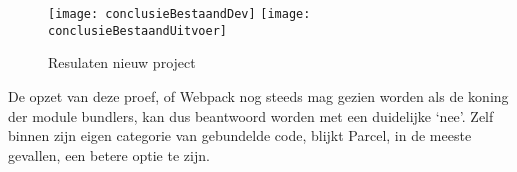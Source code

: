 \begin{figure}[h]
    \texttt{[image: conclusieBestaandDev]}
        \centering
        \texttt{[image: conclusieBestaandUitvoer]}
        \centering
        \caption{Resulaten nieuw project}
    \end{figure}

    De opzet van deze proef, of Webpack nog steeds mag gezien worden als de koning der module bundlers, kan dus beantwoord worden met een duidelijke ‘nee’. Zelf binnen zijn eigen categorie van gebundelde code, blijkt Parcel, in de meeste gevallen, een betere optie te zijn. 